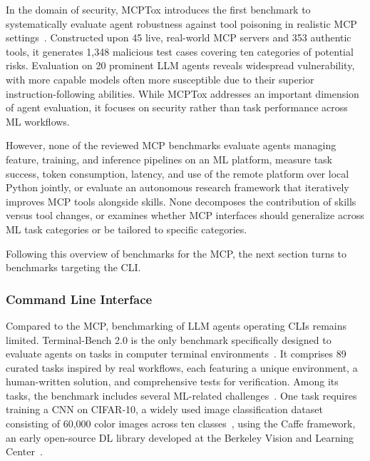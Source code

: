 \documentclass[
english,                 %
bibtex,                  %
includeExtraAbstracts, %
]{kththesis}
\numberwithin{listing}{chapter}
\begin{document}
In the domain of security, \gls{MCP}Tox introduces the first benchmark to systematically evaluate agent robustness against tool poisoning in realistic \gls{MCP} settings~\cite{wang_mcptox_2026}. Constructed upon 45 live, real-world \gls{MCP} servers and 353 authentic tools, it generates 1,348 malicious test cases covering ten categories of potential risks. Evaluation on 20 prominent \gls{LLM} agents reveals widespread vulnerability, with more capable models often more susceptible due to their superior instruction-following abilities. While \gls{MCP}Tox addresses an important dimension of agent evaluation, it focuses on security rather than task performance across \gls{ML} workflows.

However, none of the reviewed \gls{MCP} benchmarks evaluate agents managing feature, training, and inference pipelines on an \gls{ML} platform, measure task success, token consumption, latency, and use of the remote platform over local Python jointly, or evaluate an autonomous research framework that iteratively improves \gls{MCP} tools alongside skills. None decomposes the contribution of skills versus tool changes, or examines whether \gls{MCP} interfaces should generalize across \gls{ML} task categories or be tailored to specific categories.

Following this overview of benchmarks for the \gls{MCP}, the next section turns to benchmarks targeting the \gls{CLI}.

\subsubsection{Command Line Interface}

Compared to the \gls{MCP}, benchmarking of \gls{LLM} agents operating \glspl{CLI} remains limited. Terminal-Bench 2.0 is the only benchmark specifically designed to evaluate agents on tasks in computer terminal environments~\cite{merrill_terminal-bench_2026}. It comprises 89 curated tasks inspired by real workflows, each featuring a unique environment, a human-written solution, and comprehensive tests for verification. Among its tasks, the benchmark includes several \gls{ML}-related challenges~\cite{stanford_university_terminal-bench_2026}. One task requires training a \gls{CNN} on \gls{CIFAR}-10, a widely used image classification dataset consisting of 60,000 color images across ten classes~\cite{krizhevsky_learning_2009}, using the Caffe framework, an early open-source \gls{DL} library developed at the Berkeley Vision and Learning Center~\cite{jia_caffe_2014}. 
\end{document}
